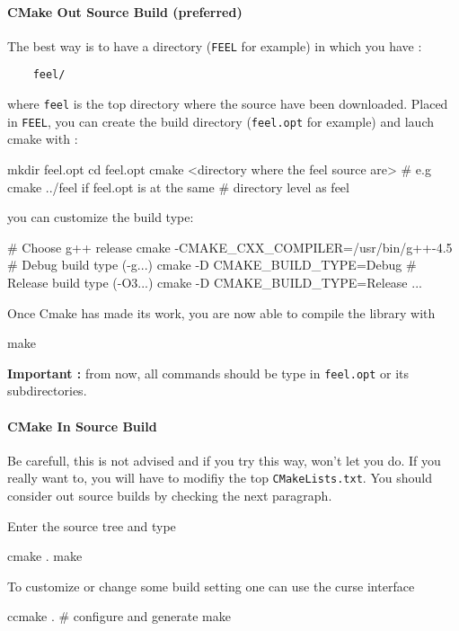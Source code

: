 \paragraph{CMake Out Source Build (preferred)}
The best way is to have a directory (\verb|FEEL| for example) in which you have : \\
\begin{lstlisting}
	feel/
\end{lstlisting}
where \verb|feel| is the top directory where the source have been downloaded. Placed in \verb|FEEL|, you can create the build directory (\verb|feel.opt| for example) and lauch cmake with :
\begin{unixcom}
  mkdir feel.opt
  cd feel.opt
  cmake <directory where the feel source are>
  # e.g cmake ../feel if feel.opt is at the same
  # directory level as feel
\end{unixcom}
you can customize the build type:
\begin{unixcom}
  # Choose g++ release
  cmake -CMAKE_CXX_COMPILER=/usr/bin/g++-4.5
  # Debug build type (-g...)
  cmake -D CMAKE_BUILD_TYPE=Debug
  # Release build type (-O3...)
  cmake -D CMAKE_BUILD_TYPE=Release
  ...
\end{unixcom}
Once Cmake has made its work, you are now able to compile the library with
\begin{unixcom}
		make
\end{unixcom}
\textbf{Important :} from now, all commands should be type in \verb|feel.opt| or its subdirectories.
\paragraph{CMake In Source Build}

Be carefull, this is not advised and if you try this way, \cmake won't let you do. If you really want to, you will have to modifiy the top \verb|CMakeLists.txt|. You should consider out source builds by checking the next paragraph.

Enter the source tree and type
\begin{unixcom}
  cmake .
  make
\end{unixcom}

To customize or change some build setting one can use the \cmake curse interface
\ccmake
\begin{unixcom}
  ccmake . # configure and generate
  make
\end{unixcom}




